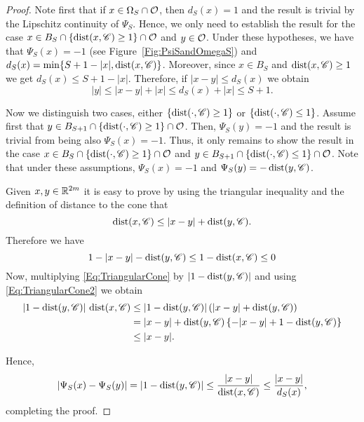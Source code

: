 \begin{proof}
Note first that if $x\in \Omega_S \cap \mathcal{O}$, then $d_S(x)=1$ and the result is trivial by the Lipschitz continuity of $\Psi_S$. Hence, we only need to establish the result for the case $x\in B_S\cap \{\operatorname{dist}(x,\mathscr{C})\geq 1\} \cap \mathcal{O}$ and $y\in \mathcal{O}$. Under these hypotheses, we have that $\Psi_S(x)=-1$ (see Figure~\ref{Fig:PsiSandOmegaS}) and $d_S(x) = \min\{S+1-|x|,\operatorname{dist}(x,\mathscr{C})\}$. Moreover, since $x\in B_S$ and $\operatorname{dist}(x,\mathscr{C})\geq 1$ we get $d_S(x) \leq S+1-|x|$. Therefore, if $|x-y|\leq d_S(x)$ we obtain
$$ |y|\leq |x-y| + |x| \leq d_S(x)+|x| \leq S+1. $$

Now we distinguish two cases, either $\{\operatorname{dist}(\cdot,\mathscr{C})\geq 1\}$ or $\{\operatorname{dist}(\cdot,\mathscr{C})\leq 1\}$. Assume first that $y\in B_{S+1} \cap \{\operatorname{dist}(\cdot,\mathscr{C})\geq 1\}\cap \mathcal{O}$. Then, $\Psi_S(y)=-1$ and the result is trivial from being also $\Psi_S(x)=-1$. Thus, it only remains to show the result in the case $x\in B_S \cap \{\operatorname{dist}(\cdot,\mathscr{C})\geq 1\}\cap \mathcal{O}$ and $y\in B_{S+1} \cap \{\operatorname{dist}(\cdot,\mathscr{C})\leq 1\}\cap \mathcal{O}$. Note that under these assumptions, $\Psi_S(x)=-1$ and $\Psi_S(y)=-\operatorname{dist}(y,\mathscr{C})$.


Given $x,y \in \mathbb{R}^{2m}$ it is easy to prove by using the triangular inequality and the definition of distance to the cone that
\begin{equation} \label{Eq:TriangularCone}
\operatorname{dist}(x,\mathscr{C}) \leq |x-y| + \operatorname{dist}(y,\mathscr{C}).
\end{equation}
Therefore we have
\begin{equation} \label{Eq:TriangularCone2}
1-|x-y|-\operatorname{dist}(y,\mathscr{C}) \leq 1-\operatorname{dist}(x,\mathscr{C}) \leq 0
\end{equation}
Now, multiplying \eqref{Eq:TriangularCone} by $|1-\operatorname{dist}(y,\mathscr{C})|$ and using \eqref{Eq:TriangularCone2} we obtain
\begin{align*}
|1-\operatorname{dist}(y,\mathscr{C})|\,\operatorname{dist}(x,\mathscr{C}) &\leq |1-\operatorname{dist}(y,\mathscr{C})| \left(|x-y| + \operatorname{dist}(y,\mathscr{C})\right) \\
&= |x-y|+\operatorname{dist}(y,\mathscr{C}) \left\{ -|x-y|+ 1- \operatorname{dist}(y,\mathscr{C}) \right\} \\
&\leq |x-y|.
\end{align*}

Hence,
$$ |\Psi_S(x)-\Psi_S(y)| = |1-\operatorname{dist}(y,\mathscr{C})| \leq \frac{|x-y|}{\operatorname{dist}(x,\mathscr{C})} \leq  \frac{|x-y|}{d_S(x)},$$
completing the proof.
\end{proof}

